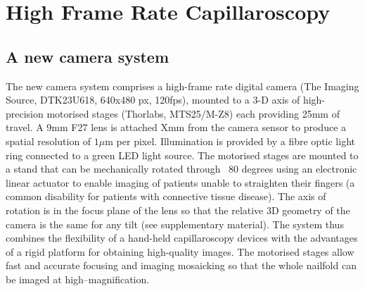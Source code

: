 \documentclass[runningheads,a4paper]{llncs}
\begin{document}
\section{High Frame Rate Capillaroscopy}
\label{s:new_system}

\subsection{A new camera system}
%
The new camera system comprises a high-frame rate digital camera (The Imaging Source, DTK23U618, 640x480 px, 120fps), mounted to a 3-D axis of high-precision motorised stages (Thorlabs, MTS25/M-Z8) each providing 25mm of travel. A 9mm F27 lens is attached Xmm from the camera sensor to produce a spatial resolution of $1{\mu}$m per pixel. Illumination is provided by a fibre optic light ring connected to a green LED light source. The motorised stages are mounted to a stand that can be mechanically rotated through ~80 degrees using an electronic linear actuator to enable imaging of patients unable to straighten their fingers (a common disability for patients with connective tissue disease). The axis of rotation is in the focus plane of the lens so that the relative 3D geometry of the camera is the same for any tilt (see supplementary material). The system thus combines the flexibility of a hand-held capillaroscopy devices with the advantages of a rigid platform for obtaining high-quality images. The motorised stages allow fast and accurate focusing and imaging mosaicking so that the whole nailfold can be imaged at high–magnification.
%
\end{document}
